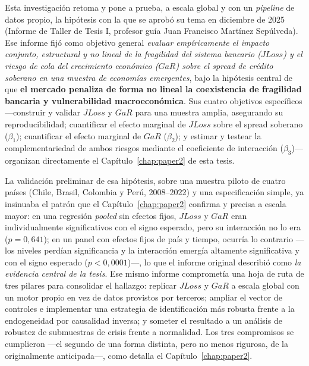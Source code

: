 Esta investigación retoma y pone a prueba, a escala global y con un \textit{pipeline} de datos propio, la hipótesis con la que se aprobó su tema en diciembre de 2025 (Informe de Taller de Tesis I, profesor guía Juan Francisco Martínez Sepúlveda). Ese informe fijó como objetivo general \textit{evaluar empíricamente el impacto conjunto, estructural y no lineal de la fragilidad del sistema bancario ($JLoss$) y el riesgo de cola del crecimiento económico ($GaR$) sobre el spread de crédito soberano en una muestra de economías emergentes}, bajo la hipótesis central de que \textbf{el mercado penaliza de forma no lineal la coexistencia de fragilidad bancaria y vulnerabilidad macroeconómica}. Sus cuatro objetivos específicos —construir y validar $JLoss$ y $GaR$ para una muestra amplia, asegurando su reproducibilidad; cuantificar el efecto marginal de $JLoss$ sobre el spread soberano ($\beta_1$); cuantificar el efecto marginal de $GaR$ ($\beta_2$); y estimar y testear la complementariedad de ambos riesgos mediante el coeficiente de interacción ($\beta_3$)— organizan directamente el Capítulo~\ref{chap:paper2} de esta tesis.

La validación preliminar de esa hipótesis, sobre una muestra piloto de cuatro países (Chile, Brasil, Colombia y Perú, 2008--2022) y una especificación simple, ya insinuaba el patrón que el Capítulo~\ref{chap:paper2} confirma y precisa a escala mayor: en una regresión \textit{pooled} sin efectos fijos, $JLoss$ y $GaR$ eran individualmente significativos con el signo esperado, pero su interacción no lo era ($p=0{,}641$); en un panel con efectos fijos de país y tiempo, ocurría lo contrario —los niveles perdían significancia y la interacción emergía altamente significativa y con el signo esperado ($p<0{,}0001$)—, lo que el informe original describió como \emph{la evidencia central de la tesis}. Ese mismo informe comprometía una hoja de ruta de tres pilares para consolidar el hallazgo: replicar $JLoss$ y $GaR$ a escala global con un motor propio en vez de datos provistos por terceros; ampliar el vector de controles e implementar una estrategia de identificación más robusta frente a la endogeneidad por causalidad inversa; y someter el resultado a un análisis de robustez de submuestras de crisis frente a normalidad. Los tres compromisos se cumplieron —el segundo de una forma distinta, pero no menos rigurosa, de la originalmente anticipada—, como detalla el Capítulo~\ref{chap:paper2}.

